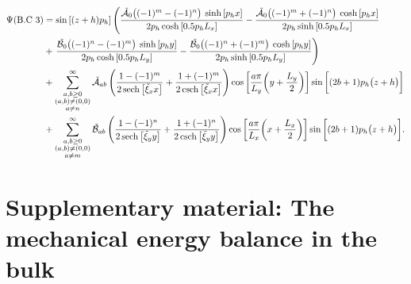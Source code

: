 \documentclass[aps,prfluids,reprint,superscriptaddress]{revtex4-2}
\newcommand{\ii}[1]{\text{#1}}
\newcommand{\nn}{\nonumber}
\numberwithin{equation}{section}
\begin{document}
\begin{align}
	\nn
	\Psi (\ii{B.C 3})&= 
	\sin{[(z+h)p_h]} \left(
	\dfrac{ \tilde{\mathcal A_0} \bigl((-1)^{m} - (-1)^n \bigr)\:
		\sinh{[p_h x]}}{2p_h \cosh{[0.5p_hL_x]}} 
	- 
	\dfrac{
		\tilde{\mathcal A_0} \bigl((-1)^{m} + (-1)^n \bigr) \:
		\cosh{[p_h x]}}{2p_h \sinh{[0.5p_hL_x]}}
	\right.
	\\
	\nn
	&+
	\left.
	\dfrac{ \tilde{\mathcal B_0} \bigl((-1)^{n} - (-1)^m \bigr)\:
		\sinh{[p_h y]}}{2p_h \cosh{[0.5p_hL_y]}} 
	- 
	\dfrac{
		\tilde{\mathcal B_0} \bigl((-1)^{n} + (-1)^m \bigr) \:
		\cosh{[p_h y]}}{2p_h \sinh{[0.5p_hL_y]}}
	\right)
	\\
	\nn
	&+
	\sum_{\substack{a, b \geq 0 \\ 
			(a,b)\neq (0,0) \\
			a\neq n}
	}^{\infty}
	\tilde{\mathcal{A}}_{ab}
	\left(
	\frac{1-(-1)^m}{2\sech{\bigl[\tilde\xi_x x \bigr]}} + \frac{1+(-1)^m}{2\csch{\bigl[\tilde\xi_x x \bigr]}}
	\right)
	\cos{\biggl[ \frac{a\pi}{L_y}\biggl(y + \frac{L_y}{2}\biggr)\biggr]}
	\sin{\biggl[ (2b+1)p_h\bigl(z + h\bigr)\biggr]} 
	\\
	&+
	\sum_{\substack{a, b \geq 0 \\ (a,b) 
			\neq (0,0)\\
			a\neq m		
	}}^{\infty}
	\tilde{\mathcal B}_{ab}
	\left(
	\frac{1-(-1)^n}{2\sech{\bigl[\tilde\xi_y y\bigr]}} + \frac{1+(-1)^n}{2\csch{\bigl[\tilde\xi_y y\bigr]}}
	\right)
	\cos{\biggl[ \frac{a\pi}{L_x}\biggl(x + \frac{L_x}{2}\biggr)\biggr]}
	\sin{\biggl[ (2b+1)p_h\bigl(z + h\bigr)\biggr]}
	.
\end{align}




\section{Supplementary material: The mechanical energy balance in the bulk} 
\label{supplB}
\end{document}
